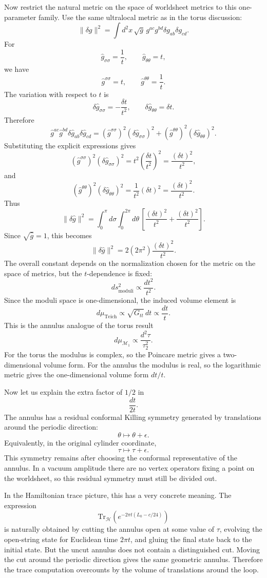 \documentclass[
  10pt,
  a4paper,
  openany]{book}
\begin{document}
Now restrict the natural metric on the space of worldsheet metrics to
this one-parameter family. Use the same ultralocal metric as in the
torus discussion: \[
\|\delta g\|^2
=
\int d^2x\,\sqrt g\,
g^{ac}g^{bd}\delta g_{ab}\delta g_{cd}.
\] For \[
\hat g_{\sigma\sigma}=\frac{1}{t},
\qquad
\hat g_{\theta\theta}=t,
\] we have \[
\hat g^{\sigma\sigma}=t,
\qquad
\hat g^{\theta\theta}=\frac{1}{t}.
\] The variation with respect to \(t\) is \[
\delta \hat g_{\sigma\sigma}
=
-\frac{\delta t}{t^2},
\qquad
\delta \hat g_{\theta\theta}
=
\delta t.
\] Therefore \[
\hat g^{ac}\hat g^{bd}\delta \hat g_{ab}\delta \hat g_{cd}
=
(\hat g^{\sigma\sigma})^2
(\delta \hat g_{\sigma\sigma})^2
+
(\hat g^{\theta\theta})^2
(\delta \hat g_{\theta\theta})^2.
\] Substituting the explicit expressions gives \[
(\hat g^{\sigma\sigma})^2
(\delta \hat g_{\sigma\sigma})^2
=
t^2\left(\frac{\delta t}{t^2}\right)^2
=
\frac{(\delta t)^2}{t^2},
\] and \[
(\hat g^{\theta\theta})^2
(\delta \hat g_{\theta\theta})^2
=
\frac{1}{t^2}(\delta t)^2
=
\frac{(\delta t)^2}{t^2}.
\] Thus \[
\|\delta \hat g\|^2
=
\int_0^\pi d\sigma\int_0^{2\pi}d\theta\,
\left[
\frac{(\delta t)^2}{t^2}
+
\frac{(\delta t)^2}{t^2}
\right].
\] Since \(\sqrt{\hat g}=1\), this becomes \[
\|\delta \hat g\|^2
=
2(2\pi^2)\frac{(\delta t)^2}{t^2}.
\] The overall constant depends on the normalization chosen for the
metric on the space of metrics, but the \(t\)-dependence is fixed: \[
ds^2_{\mathrm{moduli}}
\propto
\frac{dt^2}{t^2}.
\] Since the moduli space is one-dimensional, the induced volume element
is \[
d\mu_{\mathrm{Teich}}
\propto
\sqrt{G_{tt}}\,dt
\propto
\frac{dt}{t}.
\] This is the annulus analogue of the torus result \[
d\mu_{\mathcal M_1}
\propto
\frac{d^2\tau}{\tau_2^2}.
\] For the torus the modulus is complex, so the Poincare metric gives a
two-dimensional volume form. For the annulus the modulus is real, so the
logarithmic metric gives the one-dimensional volume form \(dt/t\).

Now let us explain the extra factor of \(1/2\) in \[
\frac{dt}{2t}.
\] The annulus has a residual conformal Killing symmetry generated by
translations around the periodic direction: \[
\theta\mapsto \theta+\epsilon.
\] Equivalently, in the original cylinder coordinate, \[
\tau\mapsto \tau+\epsilon.
\] This symmetry remains after choosing the conformal representative of
the annulus. In a vacuum amplitude there are no vertex operators fixing
a point on the worldsheet, so this residual symmetry must still be
divided out.

In the Hamiltonian trace picture, this has a very concrete meaning. The
expression \[
\mathrm{Tr}_{\mathcal H}
\left(e^{-2\pi t(L_0-c/24)}\right)
\] is naturally obtained by cutting the annulus open at some value of
\(\tau\), evolving the open-string state for Euclidean time \(2\pi t\),
and gluing the final state back to the initial state. But the uncut
annulus does not contain a distinguished cut. Moving the cut around the
periodic direction gives the same geometric annulus. Therefore the trace
computation overcounts by the volume of translations around the loop.
\end{document}
